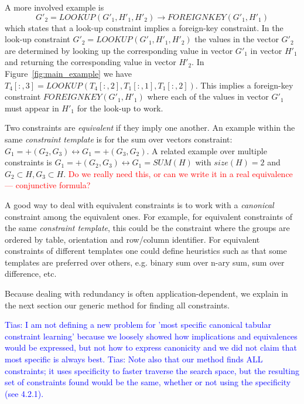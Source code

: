 \documentclass{sig-alternate-05-2015}
\newcommand{\tias}[1]{\textcolor{blue}{{\sc Tias:} #1}\xspace}
\newcommand{\format}[1]{\textit{#1}\xspace}
\newcommand{\template}{\format{constraint template}}
\newcommand{\range}[3]{\ensuremath{#1[#2,#3]}}
\newcommand{\rangeall}{:}
\newcommand{\eccalc}[2]{\ensuremath{#1 = #2}}
\newcommand{\ecfkey}[2]{\ensuremath{FOREIGNKEY(#1,#2)}}
\newcommand{\eclookupf}[4]{\ensuremath{\mathit{LOOKUP}_{\mathit{#4}}(#1, #2, #3)}}
\newcommand{\eclookup}[4]{\eccalc{#1}{\eclookupf{#2}{#3}{#4}{}}}
\newcommand{\luc}[1]{{\textcolor{red}{#1}}}
\begin{document}
A more involved example is
$$\eclookup{G'_2}{G'_1}{H'_1}{H'_2} \rightarrow \ecfkey{G'_1}{H'_1}$$
which states
that a look-up constraint implies a foreign-key constraint. In the look-up constraint $\eclookup{G'_2}{G'_1}{H'_1}{H'_2}$ the values in the vector $G'_2$ are determined by looking up the corresponding value in vector $G'_1$ in vector $H'_1$ and returning the corresponding value in vector $H'_2$. In Figure~\ref{fig:main_example} we have $\eclookup{\range{T_{4}}{\rangeall}{3}}{\range{T_{4}}{\rangeall}{2}}{\range{T_{1}}{\rangeall}{1}}{\range{T_{1}}{\rangeall}{2}}$. This implies a foreign-key constraint $\ecfkey{G'_1}{H'_1}$ where each of the values in vector $G'_1$ must appear in $H'_1$ for the look-up to work.

Two constraints are \textit{equivalent} if they imply one another. %
An example within the same \template is for the sum over vectors constraint: $G_1 = +(G_2, G_3) \leftrightarrow G_1 = +(G_3, G_2)$. A related example over multiple constraints is $G_1 = +(G_2, G_3) \leftrightarrow G_1 = SUM(H)$ with $size(H) = 2$ and $G_2 \subset H, G_3 \subset H$.
\luc{Do we really need this, or can we write it in a real equivalence --- conjunctive formula?}

A good way to deal with equivalent constraints is to work with a \textit{canonical} constraint among the equivalent ones. For example, for equivalent constraints of the same \template, this could be the constraint where the groups are ordered by table, orientation and row/column identifier. For equivalent constraints of different templates one could define heuristics such as that some templates are preferred over others, e.g. binary sum over n-ary sum, sum over difference, etc.

Because dealing with redundancy is often application-dependent, we explain in the next section our generic method for finding all constraints.

\tias{I am not defining a new problem for 'most specific canonical tabular constraint learning' because we loosely showed how implications and equivalences would be expressed, but not how to express canonicity and we did not claim that most specific is always best.}
\tias{Note also that our method finds ALL constraints; it uses specificity to faster traverse the search space, but the resulting set of constraints found would be the same, whether or not using the specificity (see 4.2.1).}
\end{document}
